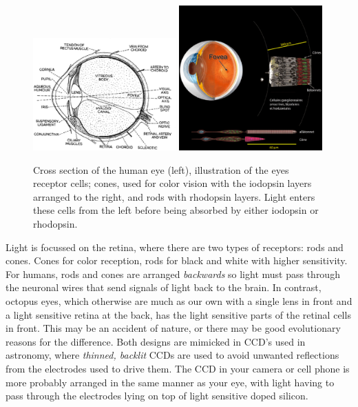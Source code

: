 \begin{figure}[h!]
\includegraphics[width=0.49\textwidth]{eye-schematic.eps}
\includegraphics[width=0.49\textwidth]{eye-rod-cone.eps}
\caption{Cross section of the human eye (left), illustration of the eyes
receptor cells; cones, used for color vision with the iodopsin layers 
arranged to the right, and rods with rhodopsin layers. Light enters these
cells from the left before being absorbed by either iodopsin or rhodopsin.}
\end{figure}

Light is focussed on the retina, where there are two types of
receptors: rods and cones. Cones for color reception, rods for black
and white with higher sensitivity. For humans, rods and cones are
arranged {\it backwards} so light must pass through the neuronal wires
that send signals of light back to the brain. In contrast, octopus
eyes, which otherwise are much as our own with a single lens in front
and a light sensitive retina at the back, has the light sensitive
parts of the retinal cells in front. This may be an accident of
nature, or there may be good evolutionary reasons for
the difference. Both designs are mimicked in CCD's used in astronomy,
where {\it thinned, backlit} CCDs are used to avoid unwanted reflections from
the electrodes used to drive them. The CCD in your camera or cell
phone is more probably arranged in the same manner as your eye, with
light having to pass through the electrodes lying on top of light
sensitive doped silicon.

